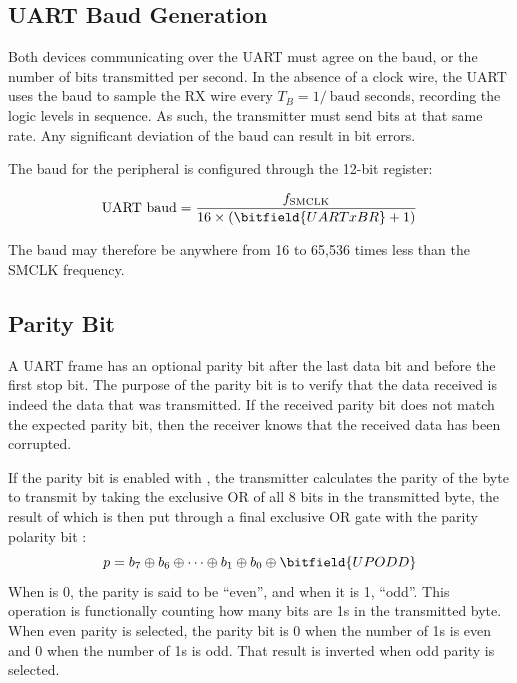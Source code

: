 \subsection{UART Baud Generation}

Both devices communicating over the UART must agree on the baud, or the number of bits transmitted per second. In the absence of a clock wire, the UART uses the baud to sample the RX wire every $T_B = 1/\ \textrm{baud}$ seconds, recording the logic levels in sequence. As such, the transmitter must send bits at that same rate. Any significant deviation of the baud can result in bit errors.

The baud for the  peripheral is configured through the 12-bit  register:

\begin{equation*}
	\textrm{UART baud} = \frac{f_\textrm{SMCLK}}{16 \times (\bitfield{UARTxBR} + 1)}
\end{equation*}

The baud may therefore be anywhere from 16 to 65,536 times less than the SMCLK frequency.



\subsection{Parity Bit}

A UART frame has an optional parity bit after the last data bit and before the first stop bit. The purpose of the parity bit is to verify that the data received is indeed the data that was transmitted. If the received parity bit does not match the expected parity bit, then the receiver knows that the received data has been corrupted.

If the parity bit is enabled with , the transmitter calculates the parity of the byte to transmit by taking the exclusive OR of all 8 bits in the transmitted byte, the result of which is then put through a final exclusive OR gate with the parity polarity bit :
\begin{equation*}
p = b_7 \oplus b_6 \oplus \cdots \oplus b_1 \oplus b_0 \oplus \bitfield{UPODD}
\end{equation*}
When  is 0, the parity is said to be ``even'', and when it is 1, ``odd''. This operation is functionally counting how many bits are 1s in the transmitted byte. When even parity is selected, the parity bit is 0 when the number of 1s is even and 0 when the number of 1s is odd. That result is inverted when odd parity is selected.

